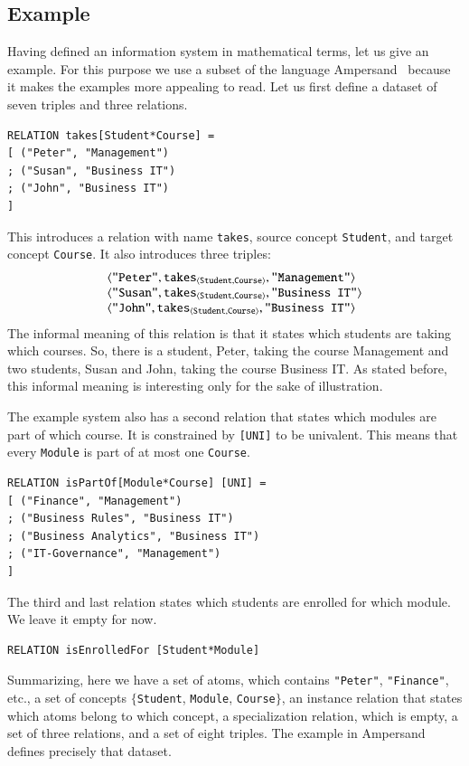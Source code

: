 \documentclass{elsarticle}
\begin{document}
\subsection{Example}
\label{As-is IS}
   Having defined an information system in mathematical terms, let us give an example.
   For this purpose we use a subset of the language Ampersand~\cite{Joosten-JLAMP2018}
   because it makes the examples more appealing to read.
   Let us first define a dataset of seven triples and three relations.
\begin{verbatim}
RELATION takes[Student*Course] =
[ ("Peter", "Management")
; ("Susan", "Business IT")
; ("John", "Business IT")
]
\end{verbatim}
   This introduces a relation with name \verb#takes#,
   source concept \verb#Student#, and
   target concept \verb#Course#.
   It also introduces three triples:
\[\begin{array}{l}
   \langle{\text{\tt "Peter"}},{\text{\it \text{\tt takes}\/}_{\langle{\text{\tt Student}},{\text{\tt Course}}\rangle}},{\text{\tt "Management"}}\rangle\\
   \langle{\text{\tt "Susan"}},{\text{\it \text{\tt takes}\/}_{\langle{\text{\tt Student}},{\text{\tt Course}}\rangle}},{\text{\tt "Business IT"}}\rangle\\
   \langle{\text{\tt "John"}},{\text{\it \text{\tt takes}\/}_{\langle{\text{\tt Student}},{\text{\tt Course}}\rangle}},{\text{\tt "Business IT"}}\rangle\\
\end{array}\]
   The informal meaning of this relation is that it states which students are taking which courses.
   So, there is a student, Peter, taking the course Management and two students, Susan and John, taking the course Business IT.
   As stated before, this informal meaning is interesting only for the sake of illustration.

   The example system also has a second relation that states which modules are part of which course.
   It is constrained by \verb-[UNI]- to be univalent.
   This means that every \verb-Module- is part of at most one \verb-Course-.
\begin{verbatim}
RELATION isPartOf[Module*Course] [UNI] =
[ ("Finance", "Management")
; ("Business Rules", "Business IT")
; ("Business Analytics", "Business IT")
; ("IT-Governance", "Management")
]
\end{verbatim}
   The third and last relation states which students are enrolled for which module.
   We leave it empty for now.
\begin{verbatim}
RELATION isEnrolledFor [Student*Module]
\end{verbatim}
   Summarizing, here we have a set of atoms, which contains \verb-"Peter"-, \verb-"Finance"-, etc.,
   a set of concepts $\{$\verb-Student-, \verb-Module-, \verb-Course-$\}$,
   an instance relation that states which atoms belong to which concept,
   a specialization relation, which is empty,
   a set of three relations, and
   a set of eight triples.
   The example in Ampersand defines precisely that dataset.
   
\end{document}

